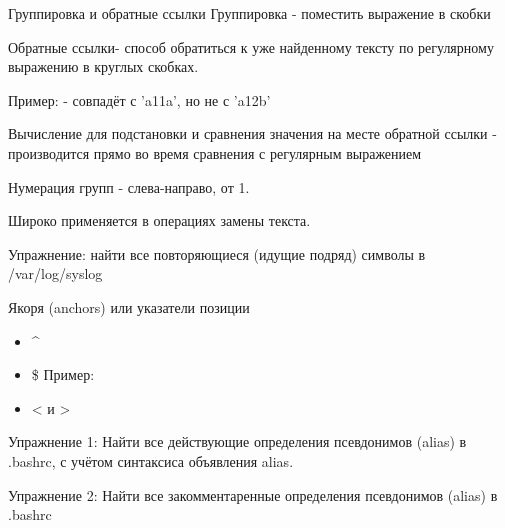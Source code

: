 \begin{frame}{Группировка и обратные ссылки}
  \alert{Группировка} - поместить выражение в скобки \footnotemark[22] 
   \newline \pause

  \alert{Обратные ссылки}\footnotemark[22] - способ обратиться к уже найденному тексту по регулярному выражению в круглых скобках.

  Пример:  - совпадёт с 'a11a', но не с 'a12b'  \newline
  
  Вычисление для подстановки и сравнения значения на месте обратной ссылки - производится прямо во время сравнения с регулярным выражением\newline\pause

  \alert{Нумерация групп} - слева-направо, от 1. \newline

  Широко применяется в операциях замены текста.

  {Упражнение}: найти все повторяющиеся (идущие подряд) символы в /var/log/syslog

\end{frame}

\begin{frame}{Якоря (anchors) или указатели позиции}

  \begin{itemize}
    \item \alert{\textasciicircum{}}
    \item \alert{\$} \newline
      Пример: \pause
    \item \alert{\tbs <} и \alert{\tbs >}
  \end{itemize}

  \alert{Упражнение 1}: Найти все действующие определения псевдонимов (alias) в .bashrc, с учётом синтаксиса объявления alias.

  \alert{Упражнение 2}: Найти все закомментаренные  определения псевдонимов (alias) в .bashrc

\end{frame}


